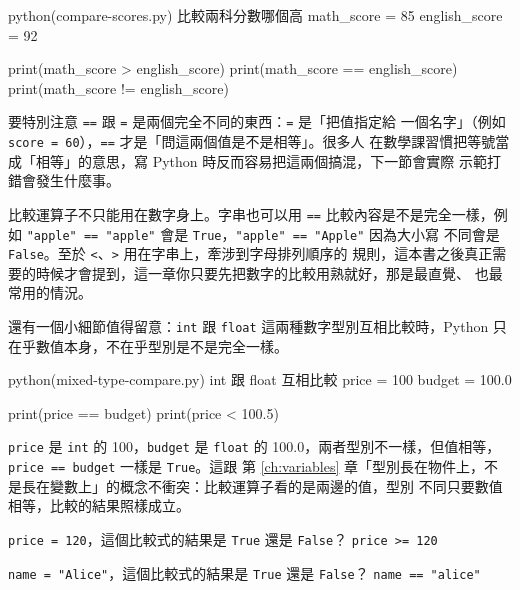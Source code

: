\begin{example}{python}{(compare-scores.py) 比較兩科分數哪個高}
math_score = 85
english_score = 92

print(math_score > english_score)
print(math_score == english_score)
print(math_score != english_score)
\end{example}



要特別注意 \texttt{==} 跟 \texttt{=} 是兩個完全不同的東西：\texttt{=} 是「把值指定給
一個名字」（例如 \texttt{score = 60}），\texttt{==} 才是「問這兩個值是不是相等」。很多人
在數學課習慣把等號當成「相等」的意思，寫 Python 時反而容易把這兩個搞混，下一節會實際
示範打錯會發生什麼事。

比較運算子不只能用在數字身上。字串也可以用 \texttt{==} 比較內容是不是完全一樣，例如
\texttt{"apple" == "apple"} 會是 \texttt{True}，\texttt{"apple" == "Apple"} 因為大小寫
不同會是 \texttt{False}。至於 \texttt{<}、\texttt{>} 用在字串上，牽涉到字母排列順序的
規則，這本書之後真正需要的時候才會提到，這一章你只要先把數字的比較用熟就好，那是最直覺、
也最常用的情況。

還有一個小細節值得留意：\texttt{int} 跟 \texttt{float} 這兩種數字型別互相比較時，Python
只在乎數值本身，不在乎型別是不是完全一樣。

\begin{example}{python}{(mixed-type-compare.py) int 跟 float 互相比較}
price = 100
budget = 100.0

print(price == budget)
print(price < 100.5)
\end{example}


\texttt{price} 是 \texttt{int} 的 100，\texttt{budget} 是 \texttt{float} 的
100.0，兩者型別不一樣，但值相等，\texttt{price == budget} 一樣是 \texttt{True}。這跟
第 \ref{ch:variables} 章「型別長在物件上，不是長在變數上」的概念不衝突：比較運算子看的是兩邊的值，型別
不同只要數值相等，比較的結果照樣成立。

\begin{drills}[label=drills:comparison-operators]
\item \texttt{price = 120}，這個比較式的結果是 \texttt{True} 還是 \texttt{False}？
\texttt{price >= 120}
\item \texttt{name = "Alice"}，這個比較式的結果是 \texttt{True} 還是 \texttt{False}？
\texttt{name == "alice"}
\end{drills}

